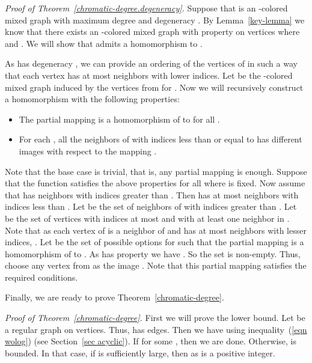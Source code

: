 \documentclass[11pt]{article}
\begin{document}
\medskip

\noindent \textit{Proof of Theorem~\ref{chromatic-degree.degeneracy}.} Suppose that  is an -colored mixed graph with maximum degree  and degeneracy 
.
By Lemma~\ref{key-lemma} we know that there exists an -colored mixed graph  with property 
 on  vertices
where  and . We will show that  admits a homomorphism to . 


As  has degeneracy , we can provide an ordering  of the vertices of  in such a way that each vertex  has at most  neighbors with lower indices.
Let  be the  -colored mixed graph induced by the vertices  from  for . 
Now we will recursively construct a  homomorphism  with the following properties:

\begin{itemize}
\item[] The partial mapping  is a homomorphism of   to  for all .

\item[]  For each , all the neighbors of  with indices less than or equal to  has different images with respect to the mapping .  
\end{itemize} 

Note that the base case is trivial, that is, any partial mapping  is enough. 
Suppose that the function  satisfies the above properties for all  where  is  fixed. 
Now assume that  has  neighbors with indices greater than . 
Then  has at most  neighbors with  indices less than . 
Let  be the set of neighbors of    with  indices greater than .
 Let  be the set of vertices   with indices at most  and with at least one neighbor in . 
 Note that as each vertex of  is a neighbor 
 of  and has at most  neighbors with lesser indices, . 
 Let  be the set of possible  options for  such that the partial mapping 
 is a homomorphism of  to . 
 As  has property  we have . 
 So the set  is non-empty. 
 Thus, choose any vertex from  as the image . 
 Note that this partial mapping satisfies the required conditions.  \hfill 
 
 


\medskip


Finally, we are ready to prove Theorem~\ref{chromatic-degree}.

\medskip

\noindent \textit{Proof of Theorem~\ref{chromatic-degree}.}  First we will prove the lower bound. 
Let  be a  regular graph on  vertices. Thus,  has   edges. Then 
we have  
using inequality~(\ref{eqn wolog}) (see Section~\ref{sec acyclic}). If  for some , then we are done. 
Otherwise,  is bounded. In that case, if  is sufficiently large, then  as 
 is a positive integer.
\end{document}
